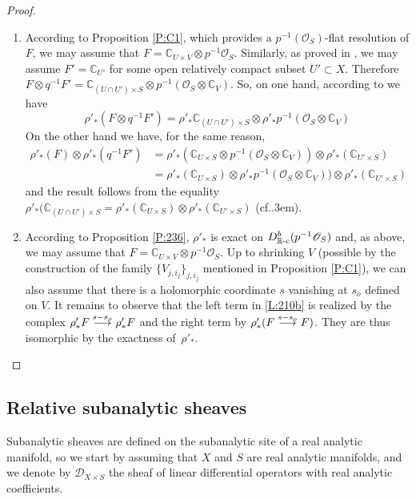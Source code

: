 \documentclass[english]{smfart}
\numberwithin{subsection}{section}
\newenvironment{enumeratea}
{\bgroup\def\theenumi{\alph{enumi}}\begin{enumerate}}
{\end{enumerate}\egroup}
\def\shd{\mathcal{D}}\let\cD\shd
\def\sho{\mathcal{O}}\let\cO\sho
\newcommand{\C}{\mathbb{C}}\let\CC\C
\newcommand{\R}{\mathbb{R}}\let\RR\R
\newcommand{\rc}{{\R\textup{-c}}}
\newcommand{\XS}{X\times S}
\def\cf{cf.\kern.3em}
\newcommand{\pOS}{p^{-1}\sho_S}
\numberwithin{equation}{section}
\theoremstyle{plain}
\theoremstyle{definition}
\def\To#1{\mathchoice{\xrightarrow{\textstyle\kern4pt#1\kern3pt}}{\stackrel{#1}{\longrightarrow}}{}{}}
\begin{document}
\begin{proof}\mbox{}
\begin{enumeratea}
\item
According to Proposition \ref{P:C1}, which provides a $p^{-1}(\sho_S)$-flat resolution of $F$, we may assume that $F=\C_{U\times V}\otimes p^{-1}\sho_S$. Similarly, as proved in \cite{Kashiwara84}, we may assume $F'=\C_{U'}$ for some open relatively compact subset $U'\subset X$. Therefore $F\otimes q^{-1}F'=\C_{(U\cap U')\times S}\otimes p^{-1}(\sho_S\otimes \C_V)$. So, on one hand, according to \cite[Lem.\,3.6(2)]{MF-P14} we have $$\rho'_*(F\otimes q^{-1}F')=\rho'_*\C_{(U\cap U')\times S}\otimes \rho'_*p^{-1}(\sho_S\otimes \C_V)$$
On the other hand we have, for the same reason,
\begin{align*}
\rho'_*(F)\otimes \rho'_*(q^{-1}F')&=\rho'_*(\C_{U\times S}\otimes p^{-1}(\sho_S\otimes \C_V))\otimes \rho'_*(\C_{U'\times S})\\
&=\rho'_*(\C_{U\times S})\otimes \rho'_*p^{-1}(\sho_S\otimes \C_V))\otimes \rho'_*(\C_{U'\times S})
\end{align*}
and the result follows from the equality $\rho'_*(\C_{(U\cap U')\times S}=\rho'_*(\C_{U\times S})\otimes \rho'_*(\C_{U'\times S})$
(\cf \hbox{\cite[Th.\,2.2.6(2)]{E-P16}}).

\item
According to Proposition \ref{P:236}, $\rho'_*$ is exact on $D^b_\rc(\pOS)$ and, as above, we may assume that $F=\C_{U\times V}\otimes p^{-1}\sho_S$. Up to shrinking $V$ (possible by the construction of the family $\{V_{j,i_j}\}_{j,i_j}$ mentioned in Proposition \ref{P:C1}), we can also assume that there is a holomorphic coordinate $s$ vanishing at $s_o$ defined on $V$. It remains to observe that the left term in \eqref{L:210b} is realized by the complex
$\rho'_*F\To{s-s_o}\rho'_*F$ and the right term by $\rho'_*(F\To{s-s_o}F)$. They are thus isomorphic by the exactness of~$\rho'_*$.\qedhere
\end{enumeratea}
\end{proof}

\subsection{Relative subanalytic sheaves}
Subanalytic sheaves are defined on the subanalytic site of a real analytic manifold, so we start by assuming that $X$ and $S$ are real analytic manifolds, and we denote by $\shd_{\XS}$ the sheaf of linear differential operators with real analytic coefficients.
\end{document}
